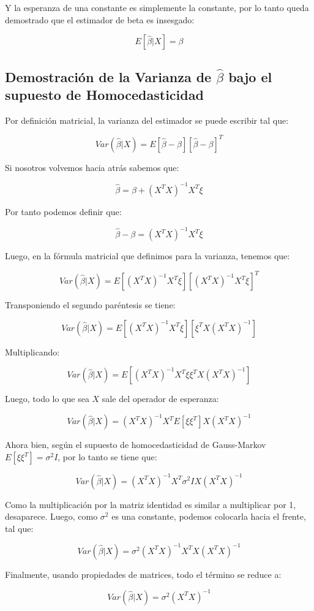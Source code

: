 \documentclass[
]{book}
\begin{document}
Y la esperanza de una constante es simplemente la constante, por lo tanto queda demostrado que el estimador de beta es insesgado:

\[
E[\hat{\beta}|X] = \beta
\]

\subsection{\texorpdfstring{Demostración de la Varianza de \(\hat{\beta}\) bajo el supuesto de Homocedasticidad}{Demostración de la Varianza de \textbackslash hat\{\textbackslash beta\} bajo el supuesto de Homocedasticidad}}\label{demostraciuxf3n-de-la-varianza-de-hatbeta-bajo-el-supuesto-de-homocedasticidad}

Por definición matricial, la varianza del estimador se puede escribir tal que:

\[
Var(\hat{\beta}|X) = E[\hat{\beta} - \beta][\hat{\beta} - \beta]^T
\]

Si nosotros volvemos hacia atrás sabemos que:

\[
\hat{\beta} = \beta + (X^TX)^{-1}X^T\xi
\]

Por tanto podemos definir que:

\[
\hat{\beta} - \beta = (X^TX)^{-1}X^T\xi
\]

Luego, en la fórmula matricial que definimos para la varianza, tenemos que:

\[
Var(\hat{\beta}|X) = E[(X^TX)^{-1}X^T\xi][(X^TX)^{-1}X^T\xi]^T
\]

Transponiendo el segundo paréntesis se tiene:

\[
Var(\hat{\beta}|X) = E[(X^TX)^{-1}X^T\xi][\xi^TX(X^TX)^{-1}]
\]

Multiplicando:

\[
Var(\hat{\beta}|X) = E[(X^TX)^{-1}X^T\xi\xi^TX(X^TX)^{-1}]
\]

Luego, todo lo que sea \(X\) sale del operador de esperanza:

\[
Var(\hat{\beta}|X) = (X^TX)^{-1}X^TE[\xi\xi^T]X(X^TX)^{-1}
\]

Ahora bien, según el supuesto de homocedasticidad de Gauss-Markov \(E[\xi\xi^T] = \sigma^2I\), por lo tanto se tiene que:

\[
Var(\hat{\beta}|X) = (X^TX)^{-1}X^T\sigma^2IX(X^TX)^{-1}
\]

Como la multiplicación por la matriz identidad es similar a multiplicar por 1, desaparece. Luego, como \(\sigma^2\) es una constante, podemos colocarla hacia el frente, tal que:

\[
Var(\hat{\beta}|X) = \sigma^2(X^TX)^{-1}X^TX(X^TX)^{-1}
\]

Finalmente, usando propiedades de matrices, todo el término se reduce a:

\[
Var(\hat{\beta}|X) = \sigma^2(X^TX)^{-1}
\]
\end{document}
